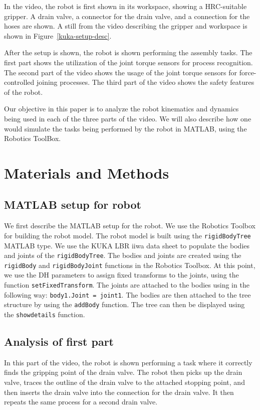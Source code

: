\documentclass[conference]{IEEEtran}
\begin{document}
In the video, the robot is first shown in its workspace, showing a HRC-suitable
gripper. A drain valve, a connector for the drain valve, and a connection for
the hoses are shown. A still from the video describing the gripper and workspace is shown in Figure~\ref{kuka-setup-desc}.

After the setup is shown, the robot is shown performing the assembly tasks. The first
part shows the utilization of the joint torque sensors for process recognition. The second
part of the video shows the usage of the joint torque sensors for force-controlled
joining processes. The third part of the video shows the safety features of the robot.

Our objective in this paper is to analyze the robot kinematics and dynamics being
used in each of the three parts of the video. We will also describe how one would
simulate the tasks being performed by the robot in MATLAB, using the Robotics
ToolBox.

\section{Materials and Methods}

\subsection{MATLAB setup for robot}

We first describe the MATLAB setup for the robot. We use the Robotics Toolbox for
building the robot model. The robot model is built using the \texttt{rigidBodyTree} MATLAB type.
We use the KUKA LBR iiwa data sheet to populate the bodies and joints of the
\texttt{rigidBodyTree}. The bodies and joints are created using the \texttt{rigidBody} and
\texttt{rigidBodyJoint} functions in the Robotics Toolbox. At this point, we use
the DH parameters to assign fixed transforms to the joints, using the function
\texttt{setFixedTransform}.
The joints are attached to the bodies
using in the following way: \texttt{body1.Joint = joint1}. The bodies are then
attached to the tree structure by using the \texttt{addBody} function. The tree
can then be displayed using the \texttt{showdetails} function.
\subsection{Analysis of first part}

In this part of the video, the robot is shown performing a task where it correctly
finds the gripping point of the drain valve. The robot then picks up the drain valve,
traces the outline of the drain valve to the attached stopping point, and then inserts
the drain valve into the connection for the drain valve. It then repeats the same process
for a second drain valve.
\end{document}
